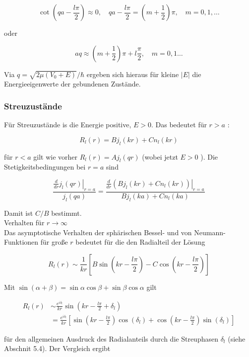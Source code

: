 \documentclass[10pt, letterpaper]{article}
\begin{document}
$$
\cot \left(q a-\frac{l \pi}{2}\right) \approx 0, \quad q a-\frac{l \pi}{2}=\left(m+\frac{1}{2}\right) \pi, \quad m=0,1, \ldots
$$

oder

$$
a q \approx\left(m+\frac{1}{2}\right) \pi+l \frac{\pi}{2}, \quad m=0,1 \ldots
$$

Via $q=\sqrt{2 \mu\left(V_{0}+E\right)} / \hbar$ ergeben sich hieraus für kleine $|E|$ die Energieeigenwerte der gebundenen Zustände.








\subsubsection*{Streuzustände}
Für Streuzustände is die Energie positive, $E>0$. Das bedeutet für $r>a$ :

$$
R_{l}(r)=B j_{l}(k r)+C n_{l}(k r)
$$

für $r<a$ gilt wie vorher $R_{l}(r)=A j_{l}(q r)$ (wobei jetzt $E>0$ ). Die Stetigkeitsbedingungen bei $r=a$ sind

$$
\frac{\left.\frac{d}{d r} j_{l}(q r)\right|_{r=a}}{j_{l}(q a)}=\frac{\left.\frac{d}{d r}\left(B j_{l}(k r)+C n_{l}(k r)\right)\right|_{r=a}}{B j_{l}(k a)+C n_{l}(k a)}
$$

Damit ist $C / B$ bestimmt.\\
Verhalten für $r \rightarrow \infty$\\
Das asymptotische Verhalten der sphärischen Bessel- und von Neumann-Funktionen für große $r$ bedeutet für die den Radialteil der Lösung

$$
R_{l}(r) \sim \frac{1}{k r}\left[B \sin \left(k r-\frac{l \pi}{2}\right)-C \cos \left(k r-\frac{l \pi}{2}\right)\right]
$$

Mit $\sin (\alpha+\beta)=\sin \alpha \cos \beta+\sin \beta \cos \alpha$ gilt

$$
\begin{aligned}
R_{l}(r) & \sim \frac{e^{i \delta_{l}}}{k r} \sin \left(k r-\frac{l \pi}{2}+\delta_{l}\right) \\
& =\frac{e^{i \delta_{l}}}{k r}\left[\sin \left(k r-\frac{l \pi}{2}\right) \cos \left(\delta_{l}\right)+\cos \left(k r-\frac{l \pi}{2}\right) \sin \left(\delta_{l}\right)\right]
\end{aligned}
$$

für den allgemeinen Ausdruck des Radialanteils durch die Streuphasen $\delta_{l}$ (siehe Abschnit 5.4). Der Vergleich ergibt
\end{document}
